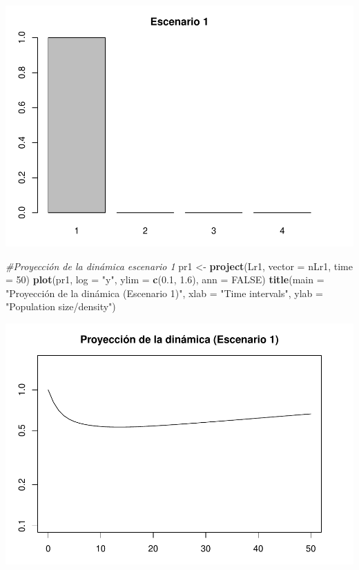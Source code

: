 \documentclass[
]{book}
\newenvironment{Shaded}{\begin{snugshade}}{\end{snugshade}}
\newcommand{\AttributeTok}[1]{\textcolor[rgb]{0.13,0.29,0.53}{#1}}
\newcommand{\CommentTok}[1]{\textcolor[rgb]{0.56,0.35,0.01}{\textit{#1}}}
\newcommand{\ConstantTok}[1]{\textcolor[rgb]{0.56,0.35,0.01}{#1}}
\newcommand{\DecValTok}[1]{\textcolor[rgb]{0.00,0.00,0.81}{#1}}
\newcommand{\FloatTok}[1]{\textcolor[rgb]{0.00,0.00,0.81}{#1}}
\newcommand{\FunctionTok}[1]{\textcolor[rgb]{0.13,0.29,0.53}{\textbf{#1}}}
\newcommand{\NormalTok}[1]{#1}
\newcommand{\OtherTok}[1]{\textcolor[rgb]{0.56,0.35,0.01}{#1}}
\newcommand{\StringTok}[1]{\textcolor[rgb]{0.31,0.60,0.02}{#1}}
\theoremstyle{definition}
\theoremstyle{definition}
\theoremstyle{definition}
\theoremstyle{definition}
\theoremstyle{remark}
\begin{document}
\includegraphics{Diagnostico_Poblacional_files/figure-latex/chap10_4-1.pdf}

\begin{Shaded}
\begin{Highlighting}[]
\CommentTok{\#Proyección de la dinámica escenario 1}
\NormalTok{pr1 }\OtherTok{\textless{}{-}} \FunctionTok{project}\NormalTok{(Lr1, }\AttributeTok{vector =}\NormalTok{ nLr1, }\AttributeTok{time =} \DecValTok{50}\NormalTok{)}
\FunctionTok{plot}\NormalTok{(pr1, }\AttributeTok{log =} \StringTok{"y"}\NormalTok{, }\AttributeTok{ylim =} \FunctionTok{c}\NormalTok{(}\FloatTok{0.1}\NormalTok{, }\FloatTok{1.6}\NormalTok{), }\AttributeTok{ann =} \ConstantTok{FALSE}\NormalTok{)}
\FunctionTok{title}\NormalTok{(}\AttributeTok{main =} \StringTok{"Proyección de la dinámica (Escenario 1)"}\NormalTok{, }\AttributeTok{xlab =} \StringTok{"Time intervals"}\NormalTok{, }\AttributeTok{ylab =} \StringTok{"Population size/density"}\NormalTok{)}
\end{Highlighting}
\end{Shaded}

\includegraphics{Diagnostico_Poblacional_files/figure-latex/chap10_4-2.pdf}
\end{document}
